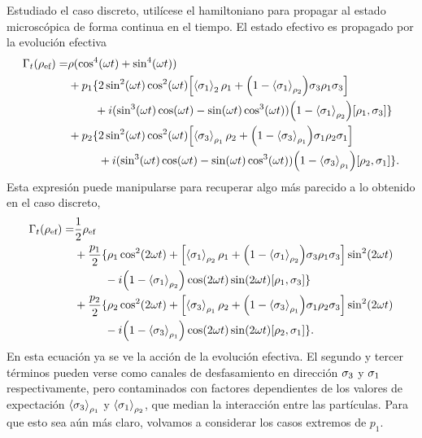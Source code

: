 Estudiado el caso discreto, utilícese el hamiltoniano para propagar al estado microscópica de forma continua en el tiempo. El estado efectivo es propagado por la evolución efectiva
\begin{align}
  \Gamma_{t}(\rho_{\text{ef}})=&\rho(\cos^{4}(\omega t)+\sin^{4}(\omega t))\nonumber\\
  &+p_{1}\{2\sin^{2}(\omega t)\cos^{2}(\omega
  t)\qty[\expval{\sigma_{1}}_{2}\rho_{1}+\qty(1-\expval{\sigma_{1}}_{\rho_{2}})\sigma_{3}\rho_{1}\sigma_{3}]\nonumber\\
  & \ \ \ \ \ \ \ +i(\sin^{3}(\omega t)\cos(\omega t)-\sin(\omega t)\cos^{3}(\omega t))\qty(1-\expval{\sigma_{1}}_{\rho_{2}})[\rho_{1},\sigma_{3}]\}\nonumber\\
  &+p_{2}\{2\sin^{2}(\omega t)\cos^{2}(\omega t)\qty[\expval{\sigma_{3}}_{\rho_{1}}\rho_{2}+\qty(1-\expval{\sigma_{3}}_{\rho_{1}})\sigma_{1}\rho_{2}\sigma_{1}]\nonumber\\
  &\ \ \ \ \ \ \ \ +i(\sin^{3}(\omega t)\cos(\omega t)-\sin(\omega t)\cos^{3}(\omega t))\qty(1-\expval{\sigma_{3}}_{\rho_{1}})[\rho_{2},\sigma_{1}]\}.\nonumber
\end{align} 
Esta expresión puede manipularse para recuperar algo más parecido a lo obtenido en el caso discreto,
\begin{align}\label{eq:EffectiveCNOT}
  \Gamma_{t}(\rho_{\ef})=&\frac{1}{2}\rho_{\ef}\nonumber\\
  &+\frac{p_{1}}{2}\{\rho_{1}\cos^{2}(2\omega t)+\qty[\expval{\pauli{1}}_{\rho_{2}}\rho_{1}+\qty(1-\expval{\pauli{1}}_{\rho_{2}})\pauli{3}\rho_{1}\pauli{3}]\sin^{2}(2\omega t)\nonumber\\
  & \ \ \ \ \ \ \ \ -i\qty(1-\expval{\pauli{1}}_{\rho_{2}})\cos(2\omega t)\sin(2\omega t)[\rho_{1},\pauli{3}]\}\nonumber\\
  &+\frac{p_{2}}{2}\{\rho_{2}\cos^{2}(2\omega t)+\qty[\expval{\pauli{3}}_{\rho_{1}}\rho_{2}+\qty(1-\expval{\pauli{3}}_{\rho_{1}})\pauli{1}\rho_{2}\pauli{3}]\sin^{2}(2\omega t)\nonumber\\
  & \ \ \ \ \ \ \ \ -i\qty(1-\expval{\pauli{3}}_{\rho_{1}})\cos(2\omega t)\sin(2\omega t)[\rho_{2},\pauli{1}]\}.
\end{align}
En esta ecuación ya se ve la acción de la evolución efectiva. El segundo y tercer términos pueden verse como canales de desfasamiento en dirección $\sigma_{3}$ y $\sigma_{1}$ respectivamente, pero contaminados con factores dependientes de los valores de expectación $\expval{\sigma_{3}}_{\rho_{1}}$ y $\expval{\sigma_{1}}_{\rho_{2}}$, que median la interacción entre las partículas. Para que esto sea aún más claro, volvamos a considerar los casos extremos de $p_{1}$.

